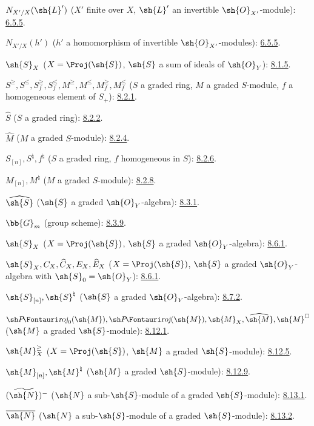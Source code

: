 $N_{X'/X}(\sh{L}')$
($X'$ finite over $X$, $\sh{L}'$ an invertible
$\sh{O}_{X'}$-module): \hyperref[II.6.5.5]{6.5.5}.

$N_{X'/X}(h')$
($h'$ a homomorphism of invertible $\sh{O}_{X'}$-modules): \hyperref[II.6.5.5]{6.5.5}.

$\sh{S}_X$ ($X=\Proj(\sh{S})$, $\sh{S}$ a sum of ideals of
$\sh{O}_Y$): \hyperref[II.8.1.5]{8.1.5}.

$S^\geq,S^\leq,S_f^\geq,S_f^\leq,
M^\geq,M^\leq,M_f^\geq,M_f^\leq$
($S$ a graded ring, $M$ a graded $S$-module,
$f$ a homogeneous element of $S_+$): \hyperref[II.8.2.1]{8.2.1}.

$\widehat S$ ($S$ a graded ring): \hyperref[II.8.2.2]{8.2.2}.

$\widehat M$ ($M$ a graded $S$-module): \hyperref[II.8.2.4]{8.2.4}.

$S_{[n]},S^\natural,f^\natural$
($S$ a graded ring, $f$ homogeneous in $S$): \hyperref[II.8.2.6]{8.2.6}.

$M_{[n]},M^\natural$ ($M$ a graded $S$-module): \hyperref[II.8.2.8]{8.2.8}.

$\widehat{\sh{S}}$ ($\sh{S}$ a graded $\sh{O}_Y$-algebra): \hyperref[II.8.3.1]{8.3.1}.

$\bb{G}_m$ (group scheme): \hyperref[II.8.3.9]{8.3.9}.

$\sh{S}_X$ ($X=\Proj(\sh{S})$, $\sh{S}$ a graded
$\sh{O}_Y$-algebra): \hyperref[II.8.6.1]{8.6.1}.

$\sh{S}_X,C_X,\widehat C_X,E_X,\widehat E_X$
($X=\Proj(\sh{S})$, $\sh{S}$ a graded $\sh{O}_Y$-algebra with
$\sh{S}_0=\sh{O}_Y$): \hyperref[II.8.6.1]{8.6.1}.

$\sh{S}_{[n]},\sh{S}^{\natural}$
($\sh{S}$ a graded $\sh{O}_Y$-algebra): \hyperref[II.8.7.2]{8.7.2}.

$\shProj_0(\sh{M}),\shProj(\sh{M}),\sh{M}_X,
\widehat{\sh{M}},\sh{M}^{\square}$
($\sh{M}$ a graded $\sh{S}$-module): \hyperref[II.8.12.1]{8.12.1}.

$\sh{M}_X^\geq$
($X=\Proj(\sh{S})$, $\sh{M}$ a graded $\sh{S}$-module): \hyperref[II.8.12.5]{8.12.5}.

$\sh{M}_{[n]},\sh{M}^{\natural}$
($\sh{M}$ a graded $\sh{S}$-module): \hyperref[II.8.12.9]{8.12.9}.

$(\widetilde{\sh{N}})^-$
($\sh{N}$ a sub-$\sh{S}$-module of a graded
$\sh{S}$-module): \hyperref[II.8.13.1]{8.13.1}.

$\overline{\sh{N}}$
($\sh{N}$ a sub-$\sh{S}$-module of a graded
$\sh{S}$-module): \hyperref[II.8.13.2]{8.13.2}.

